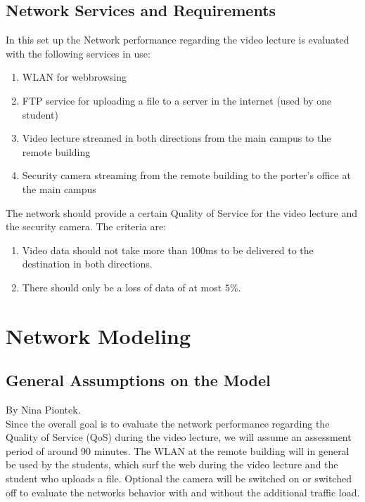 \documentclass[a4paper,10pt]{book}\usepackage{graphicx}
\begin{document}
\section{Network Services and Requirements}

In this set up the Network performance regarding the video lecture is evaluated with the following services in
use:\\
\begin{enumerate}
 \item WLAN for webbrowsing
 \item FTP service for uploading a file to a server in the internet (used by one student) 
 \item Video lecture streamed in both directions from the main campus to the remote building
 \item Security camera streaming from the remote building to the porter's office  at the main campus
\end{enumerate}

The network should provide a certain Quality of Service for the video lecture and the security camera.
The criteria are:\\
\begin{enumerate}
 \item Video data should not take more than 100ms to be delivered to the destination in both directions.
 \item There should only be a loss of data of at most $5\%$.
\end{enumerate}

\chapter{Network Modeling}
\section{General Assumptions on the Model}
By Nina Piontek.\\

Since the overall goal is to evaluate the network performance regarding the Quality of Service (QoS) during the video lecture, we will assume an assessment period
of around 90 minutes. The WLAN at the remote building will in general be used by the students, which surf the web during the video lecture and the student 
who uploads a file. Optional the camera will be switched on or switched off to evaluate the networks behavior with and without the additional
traffic load.
\end{document}
